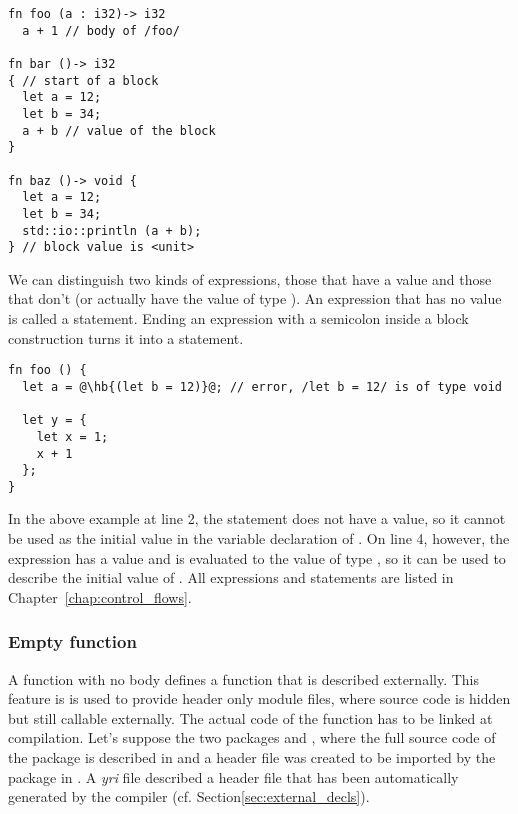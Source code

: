 \begin{lstlisting}[style=coloredverbatim]
fn foo (a : i32)-> i32
  a + 1 // body of /foo/

fn bar ()-> i32
{ // start of a block
  let a = 12;
  let b = 34;
  a + b // value of the block
}

fn baz ()-> void {
  let a = 12;
  let b = 34;
  std::io::println (a + b);
} // block value is <unit>

\end{lstlisting}

We can distinguish two kinds of expressions, those that have a value and those
that don't (or actually have the value  of type ). An
expression that has no value is called a statement. Ending an expression with a
semicolon inside a block construction turns it into a statement.

\begin{lstlisting}[style=coloredverbatim, escapechar=@]
fn foo () {
  let a = @\hb{(let b = 12)}@; // error, /let b = 12/ is of type void

  let y = {
    let x = 1;
    x + 1
  };
}
\end{lstlisting}

In the above example at line 2, the statement  does not have
a value, so it cannot be used as the initial value in the variable declaration
of . On line 4, however, the expression 
has a value and is evaluated to the value  of type , so it
can be used to describe the initial value of . All expressions and
statements are listed in Chapter~\ref{chap:control_flows}.

\subsubsection{Empty function}

A function with no body defines a function that is described externally. This
feature is is used to provide header only module files, where source code is
hidden but still callable externally. The actual code of the function has to be
linked at compilation. Let's suppose the two packages  and
, where the full source code of the package  is
described in  and a header file was created to be
imported by the package  in . A
\textit{yri} file described a header file that has been automatically generated
by the compiler (cf. Section\ref{sec:external_decls}).


